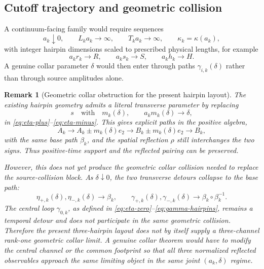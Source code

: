 \documentclass[11pt]{article}
\newtheorem{remark}[theorem]{Remark}
\begin{document}
\subsection{Cutoff trajectory and geometric collision}

A continuum-facing family would require sequences
\begin{equation}
  a_k\downarrow0,
  \qquad
  L_ka_k\longrightarrow\infty,
  \qquad
  T_ka_k\longrightarrow\infty,
  \qquad
  \kappa_k=\kappa(a_k),
  \label{eq:cutoff-trajectory}
\end{equation}
with integer hairpin dimensions scaled to prescribed physical lengths, for example
\begin{equation}
  a_kr_k\to R,
  \qquad
  a_ks_k\to S,
  \qquad
  a_kh_k\to H.
  \label{eq:physical-loop-scaling}
\end{equation}
A genuine collar parameter $\delta$ would then enter through paths $\gamma_{i,k}(\delta)$ rather than through source amplitudes alone.

\begin{remark}[Geometric collar obstruction for the present hairpin layout]
\label{rem:current-hairpin-collar-obstruction}
The existing hairpin geometry admits a literal transverse parameter by replacing
\[
  s\quad\text{with}\quad m_k(\delta),
  \qquad a_km_k(\delta)\to\delta,
\]
in \eqref{eq:eta-plus}--\eqref{eq:eta-minus}.  This gives explicit paths in the positive algebra,
\[
  A_k\to A_k\pm m_k(\delta)e_2
  \to B_k\pm m_k(\delta)e_2
  \to B_k,
\]
with the same base path \(\beta_k\), and the spatial reflection \(\rho\) still interchanges the two signs.  Thus positive-time support and the reflected pairing can be preserved.

However, this does not yet produce the geometric collar collision needed to replace the source-collision block.  As \(\delta\downarrow0\), the two transverse detours collapse to the base path:
\[
  \eta_{+,k}(\delta),\eta_{-,k}(\delta)\longrightarrow \beta_k,
  \qquad
  \gamma_{+,k}(\delta),\gamma_{-,k}(\delta)\longrightarrow \beta_k\circ\beta_k^{-1}.
\]
The central loop \(\gamma_{0,k}\), as defined in \eqref{eq:eta-zero}--\eqref{eq:gamma-hairpins}, remains a temporal detour and does not participate in the same geometric collision.  Therefore the present three-hairpin layout does not by itself supply a three-channel rank-one geometric collar limit.  A genuine collar theorem would have to modify the central channel or the common footprint so that all three normalized reflected observables approach the same limiting object in the same joint \((a_k,\delta)\) regime.
\end{remark}
\end{document}
